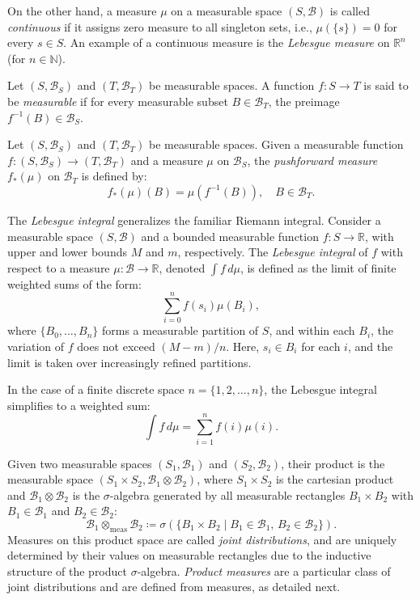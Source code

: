 On the other hand, a measure $ \mu $ on a measurable space $ (S, \mathcal{B}) $ is called \emph{continuous} if it assigns zero measure to all singleton sets, i.e., $ \mu(\{s\}) = 0 $ for every $ s \in S $. An example of a continuous measure is the \emph{Lebesgue measure} on $ \mathbb{R}^n $ (for $ n \in \mathbb{N} $).

\begin{definition}
  Let $(S, \mathcal{B}_S)$ and $(T, \mathcal{B}_T)$ be measurable spaces. A function $f: S \to T$ is said to be \emph{measurable} if for every  measurable subset  $B \in \mathcal{B}_T$, the preimage $f^{-1}(B) \in \mathcal{B}_S$.
\end{definition}

\begin{definition} \label{def:pushforward_meas_1}
  Let $(S, \mathcal{B}_S)$ and $(T, \mathcal{B}_T)$ be measurable spaces. Given a measurable function $f: (S, \mathcal{B}_S) \to (T, \mathcal{B}_T)$ and a measure $\mu$ on $\mathcal{B}_S$, the \emph{pushforward measure} $f_*(\mu)$ on $\mathcal{B}_T$ is defined by:
$$
f_*(\mu)(B) = \mu(f^{-1}(B)), \quad  B \in \mathcal{B}_T.
$$
\end{definition}






\begin{definition} 
  The \emph{Lebesgue integral} generalizes the familiar Riemann integral. Consider a measurable space $(S, \mathcal{B})$ and a bounded measurable function $f \colon S \to \mathbb{R}$, with upper and lower bounds $M$ and $m$, respectively. The \emph{Lebesgue integral} of $f$ with respect to a measure $\mu \colon \mathcal{B} \to \mathbb{R}$, denoted $\int f \, d\mu$, is defined as the limit of finite weighted sums of the form:
$$
\sum_{i=0}^n f(s_i) \mu(B_i),
$$
where $\{B_0, \dots, B_n\}$ forms a measurable partition of $S$, and within each $B_i$, the variation of $f$ does not exceed $(M - m)/n$. Here, $s_i \in B_i$ for each $i$, and the limit is taken over increasingly refined partitions. 
\end{definition}


In the case of a finite discrete space $n = \{1, 2, \dots, n\}$, the Lebesgue integral simplifies to a weighted sum:
$$
\int f \, d\mu = \sum_{i=1}^n f(i) \mu(i).
$$

Given two measurable spaces $(S_1, \mathcal{B}_1)$ and $(S_2, \mathcal{B}_2)$, their product is the measurable space $(S_1 \times S_2, \mathcal{B}_1 \otimes \mathcal{B}_2)$, where $S_1  \times S_2$ is the cartesian product and $\mathcal{B}_1 \otimes \mathcal{B}_2$ is the $\sigma$-algebra generated by all measurable rectangles $B_1 \times B_2$ with $B_1 \in \mathcal{B}_1$ and $B_2 \in \mathcal{B}_2$:
$$
\mathcal{B}_1 \otimes_{\text{meas}} \mathcal{B}_2 \coloneqq \sigma\left(\{ B_1 \times B_2 \mid B_1 \in \mathcal{B}_1,\, B_2 \in \mathcal{B}_2 \}\right).
$$
Measures on this product space are called \emph{joint distributions}, and are uniquely determined by their values on measurable rectangles due to the inductive structure of the product $\sigma$-algebra. \emph{Product measures} are a particular class of joint distributions and are defined from measures, as detailed next.


